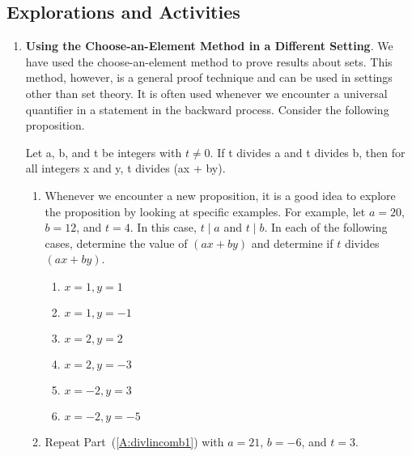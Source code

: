 \subsection*{Explorations and Activities}
\setcounter{oldenumi}{\theenumi}
\begin{enumerate} \setcounter{enumi}{\theoldenumi}
\item \textbf{Using the Choose-an-Element Method in a Different Setting}.  
We have used the choose-an-element method to prove results about sets.  This method, however, is a general proof technique and can be used in settings other than set theory.  It is often used whenever we encounter a universal quantifier in a statement in the backward process.  Consider the following proposition. 
\label{exer52-choose}

\begin{proposition} \label{P:divlinearcomb}
Let a, b, and  t  be integers with $t \ne 0$.  If  t  divides  a  and  t  divides  b, then for all integers  x  and  y,  t  divides  (ax + by).
\end{proposition}
%
\begin{enumerate}
\item Whenever we encounter a new proposition, it is a good idea to explore the proposition by looking at specific examples.  For example, let  \linebreak
$a = 20$, $b = 12$, and  $t = 4$.  In this case,  $t \mid a$  and  $t \mid b$.  In each of the following cases, determine the value of  $\left(ax + by \right)$ and determine if $t$ divides 
$\left(ax + by\right)$.  \label{A:divlincomb1}

\begin{multicols}{2}
\begin{enumerate}
\item $x=1, y=1$
\item $x=1, y=-1$
\item $x=2, y=2$
\item $x=2, y=-3$
\item $x=-2, y=3$
\item $x=-2, y=-5$
\end{enumerate}
\end{multicols}

\item Repeat Part~(\ref{A:divlincomb1}) with  $a = 21$, $b =  - 6$, and  $t = 3$.
\end{enumerate}



\end{enumerate}
